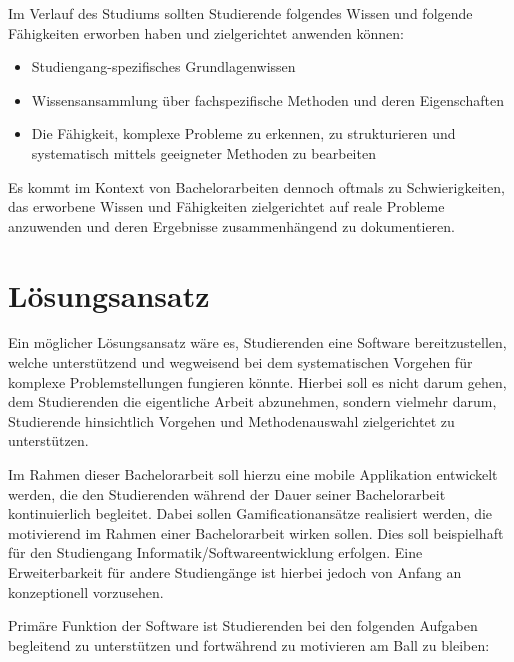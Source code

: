 \documentclass[bibliography=totoc,listof=totoc,BCOR=5mm,DIV=12,oneside]{scrbook}
\begin{document}
\par \bigskip Im Verlauf des Studiums sollten Studierende folgendes Wissen und folgende Fähigkeiten erworben haben und zielgerichtet anwenden können:
\begin{itemize}
\item Studiengang-spezifisches Grundlagenwissen
\item Wissensansammlung über fachspezifische Methoden und deren Eigenschaften
\item Die Fähigkeit, komplexe Probleme zu erkennen, zu strukturieren und systematisch mittels geeigneter Methoden zu bearbeiten
\end{itemize}

\par Es kommt im Kontext von Bachelorarbeiten dennoch oftmals zu Schwierigkeiten, das erworbene Wissen und Fähigkeiten zielgerichtet auf reale Probleme anzuwenden und deren Ergebnisse zusammenhängend zu dokumentieren.

\section*{Lösungsansatz}
\par Ein möglicher Lösungsansatz wäre es, Studierenden eine Software bereitzustellen, welche unterstützend und wegweisend bei dem systematischen Vorgehen für komplexe Problemstellungen fungieren könnte. Hierbei soll es nicht darum gehen, dem Studierenden die eigentliche Arbeit abzunehmen, sondern vielmehr darum, Studierende hinsichtlich Vorgehen und Methodenauswahl zielgerichtet zu unterstützen.
\par \bigskip Im Rahmen dieser Bachelorarbeit soll hierzu eine mobile Applikation entwickelt werden, die den Studierenden während der Dauer seiner Bachelorarbeit kontinuierlich \grqq begleitet\grqq. Dabei sollen Gamificationansätze realisiert werden, die motivierend im Rahmen einer Bachelorarbeit wirken sollen. Dies soll beispielhaft für den Studiengang Informatik/Softwareentwicklung erfolgen. Eine Erweiterbarkeit für andere Studiengänge ist hierbei jedoch von Anfang an konzeptionell vorzusehen.

\newpage
\par \bigskip Primäre Funktion der Software ist Studierenden bei den folgenden Aufgaben begleitend zu unterstützen und fortwährend zu motivieren \grqq am Ball zu bleiben\grqq:
\end{document}

